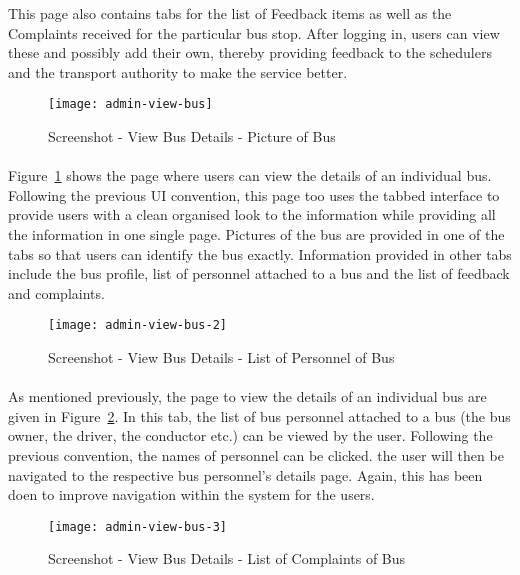 This page also contains tabs for the list of Feedback items as well as the Complaints received for the particular bus stop. After logging in, users can view these and possibly add their own, thereby providing feedback to the schedulers and the transport authority to make the service better.

\begin {figure} [H]
\centering
\texttt{[image: admin-view-bus]}
\caption [Screenshot - View Bus Details - Picture of Bus] {Screenshot - View Bus Details - Picture of Bus}
\label {image-admin-view-bus}
\end {figure}

\paragraph{} Figure~\ref{image-admin-view-bus} shows the page where users can view the details of an individual bus. Following the previous UI convention, this page too uses the tabbed interface to provide users with a clean organised look to the information while providing all the information in one single page. Pictures of the bus are provided in one of the tabs so that users can identify the bus exactly. Information provided in other tabs include the bus profile, list of personnel attached to a bus and the list of feedback and complaints.

\begin {figure} [H]
\centering
\texttt{[image: admin-view-bus-2]}
\caption [Screenshot - View Bus Details - List of Personnel of Bus] {Screenshot - View Bus Details - List of Personnel of Bus}
\label {image-admin-view-bus-2}
\end {figure}

\paragraph{} As mentioned previously, the page to view the details of an individual bus are given in Figure~\ref{image-admin-view-bus-2}. In this tab, the list of bus personnel attached to a bus (the bus owner, the driver, the conductor etc.) can be viewed by the user. Following the previous convention, the names of personnel can be clicked. the user will then be navigated to the respective bus personnel's details page. Again, this has been doen to improve navigation within the system for the users.

\begin {figure} [H]
\centering
\texttt{[image: admin-view-bus-3]}
\caption [Screenshot - View Bus Details - List of Complaints of Bus] {Screenshot - View Bus Details - List of Complaints of Bus}
\label {image-admin-view-bus-3}
\end {figure}

